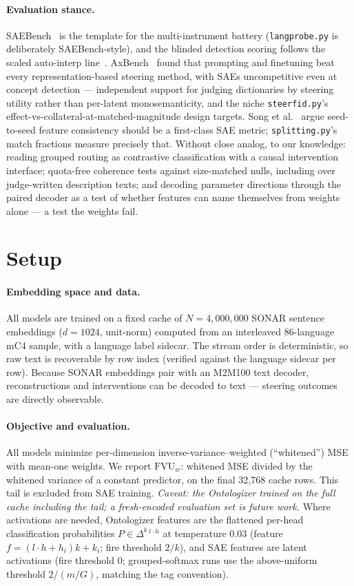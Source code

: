 \documentclass[11pt]{article}
\newcommand{\fvu}{\mathrm{FVU}_w}
\begin{document}
\paragraph{Evaluation stance.}
SAEBench~\cite{karvonen2025} is the template for the multi-instrument
battery (\texttt{langprobe.py} is deliberately SAEBench-style), and the
blinded detection scoring follows the scaled auto-interp
line~\cite{paulo2024}. AxBench~\cite{wu2025} found that prompting and
finetuning beat every representation-based steering method, with SAEs
uncompetitive even at concept detection --- independent support for
judging dictionaries by steering utility rather than per-latent
monosemanticity, and the niche \texttt{steerfid.py}'s
effect-vs-collateral-at-matched-magnitude design targets. Song et
al.~\cite{song2025} argue seed-to-seed feature consistency should be a
first-class SAE metric; \texttt{splitting.py}'s match fractions measure
precisely that. Without close analog, to our knowledge: reading grouped
routing as contrastive classification with a causal intervention
interface; quota-free coherence tests against size-matched nulls,
including over judge-written description texts; and decoding parameter
directions through the paired decoder as a test of whether features can
name themselves from weights alone --- a test the weights fail.

\section{Setup}

\paragraph{Embedding space and data.}
All models are trained on a fixed cache of $N{=}4{,}000{,}000$ SONAR
\cite{sonar} sentence embeddings ($d{=}1024$, unit-norm) computed from an
interleaved 86-language mC4 sample, with a language label sidecar. The
stream order is deterministic, so raw text is recoverable by row index
(verified against the language sidecar per row). Because SONAR embeddings
pair with an M2M100 text decoder, reconstructions and interventions can be
decoded to text --- steering outcomes are directly observable.

\paragraph{Objective and evaluation.}
All models minimize per-dimension inverse-variance--weighted (``whitened'')
MSE with mean-one weights. We report $\fvu$: whitened MSE divided by the
whitened variance of a constant predictor, on the final 32{,}768 cache
rows. This tail is excluded from SAE training. \emph{Caveat: the
Ontologizer trained on the full cache including the tail; a fresh-encoded
evaluation set is future work.} Where activations are needed, Ontologizer
features are the flattened per-head classification probabilities
$P \in \Delta^{k}{}^{\,l\cdot h}$ at temperature $0.03$ (feature
$f = (l\cdot h + h_i)k + k_i$; fire threshold $2/k$), and SAE features are
latent activations (fire threshold $0$; grouped-softmax runs use the
above-uniform threshold $2/(m/G)$, matching the tag convention).
\end{document}
